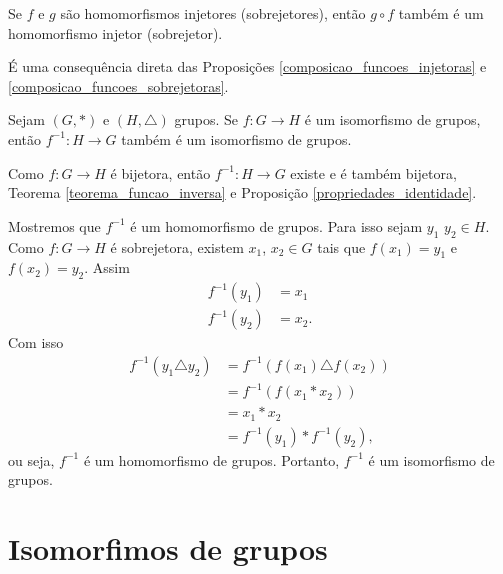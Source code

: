 \begin{corolario}
    Se $f$ e $g$ são homomorfismos injetores (sobrejetores), então $g \circ f$ também é um homomorfismo injetor (sobrejetor).
\end{corolario}
\begin{prova}
    É uma consequência direta das Proposições \eqref{composicao_funcoes_injetoras} e \eqref{composicao_funcoes_sobrejetoras}.
\end{prova}


\begin{proposicao}
    Sejam $(G, *)$ e $(H, \triangle)$ grupos. Se $f : G \to H$ é um isomorfismo de grupos, então $f^{-1} : H \to G$ também é um isomorfismo de grupos.
\end{proposicao}
\begin{prova}
    Como $f : G \to H$ é bijetora, então $f^{-1} : H \to G$ existe e é também bijetora, Teorema \eqref{teorema_funcao_inversa} e Proposição \eqref{propriedades_identidade}.

    Mostremos que $f^{-1}$ é um homomorfismo de grupos. Para isso sejam $y_1$ $y_2 \in H$. Como $f : G \to H$ é sobrejetora, existem $x_1$, $x_2 \in G$ tais que $f(x_1) = y_1$ e $f(x_2) = y_ 2$. Assim
    \begin{align*}
        f^{-1}(y_1) &= x_1\\
        f^{-1}(y_2) &= x_2.
    \end{align*}
    Com isso
    \begin{align*}
        f^{-1}(y_1 \triangle y_2) &= f^{-1}(f(x_1) \triangle f(x_2)) \\ &= f^{-1}(f(x_1 * x_2)) \\ &= x_1 * x_2 \\ &= f^{-1}(y_1) * f^{-1}(y_2),
    \end{align*}
    ou seja, $f^{-1}$ é um homomorfismo de grupos.
    Portanto, $f^{-1}$ é um isomorfismo de grupos.
\end{prova}

\section{Isomorfimos de grupos} %
\label{sec:isomorfismos_de_grupos}


